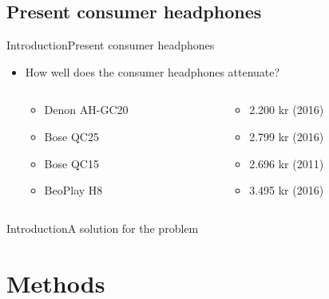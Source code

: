 \subsection{Present consumer headphones}
\begin{frame}{Introduction}{Present consumer headphones}
	\begin{itemize}	
	\item How well does the consumer headphones attenuate?
	\begin{columns}
		\begin{column}{0.27\textwidth}
		\begin{itemize}
			\item Denon AH-GC20
			\item Bose QC25 
			\item Bose QC15 	
			\item BeoPlay H8 	
		\end{itemize}
		\end{column}
		\begin{column}{0.6\textwidth} 
		\begin{itemize}
			\item[] 2.200 kr (2016)
			\item[] 2.799 kr (2016)
			\item[] 2.696 kr (2011)
			\item[] 3.495 kr (2016)
		\end{itemize}
		\end{column}
	\end{columns}
	\end{itemize}			
	\begin{center}
		
	\end{center}	
\end{frame}





\begin{frame}{Introduction}{A solution for the problem}		
\end{frame}


\section{Methods}

